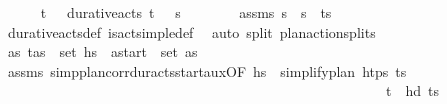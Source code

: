 \begin{isabellebody}
\ \ \ \ \isamarkupfalse%
\ {\isachardoublequoteopen}{\isacharparenleft}{\kern0pt}t\isactrlsub {\isasympi}{\isacharcomma}{\kern0pt}\ {\isasympi}{\isacharparenright}{\kern0pt}\ {\isasymin}\ durative{\isacharunderscore}{\kern0pt}acts\ {\isacharparenleft}{\kern0pt}{\isacharparenleft}{\kern0pt}t\isactrlsub {\isasympi}{\isacharcomma}{\kern0pt}\ {\isasympi}{\isacharparenright}{\kern0pt}\ {\isacharhash}{\kern0pt}\ {\isasympi}s\isanewline
\ \ \ \ \ \ \isamarkupfalse%
\ assms\ {\isacartoucheopen}{\isasympi}s\ {\isacharequal}{\kern0pt}\ {\isasympi}s\ {\isacharat}{\kern0pt}\ {\isacharparenleft}{\kern0pt}{\isacharparenleft}{\kern0pt}t\isactrlsub {\isasympi}{\isacharcomma}{\kern0pt}{\isasympi}{\isacharparenright}{\kern0pt}{\isacharhash}{\kern0pt}{\isasympi}s\isanewline
\ \ \ \ \ \ \isamarkupfalse%
\ durative{\isacharunderscore}{\kern0pt}acts{\isacharunderscore}{\kern0pt}def\ is{\isacharunderscore}{\kern0pt}act{\isacharunderscore}{\kern0pt}simple{\isacharunderscore}{\kern0pt}def\ \isamarkupfalse%
\ {\isacharparenleft}{\kern0pt}auto\ split{\isacharcolon}{\kern0pt}\ plan{\isacharunderscore}{\kern0pt}action{\isachardot}{\kern0pt}splits{\isacharparenright}{\kern0pt}\isanewline
\ \ \ \ \isamarkupfalse%
\ {\isachardoublequoteopen}{\isasymexists}as{\isachardot}{\kern0pt}\ {\isacharparenleft}{\kern0pt}t\isactrlsub {\isasympi}{\isacharcomma}{\kern0pt}as{\isacharparenright}{\kern0pt}\ {\isasymin}\ set\ hs{\isacharprime}{\kern0pt}\ {\isasymand}\ a\isactrlsub s\isactrlsub t\isactrlsub a\isactrlsub r\isactrlsub t\ {\isasymin}\ set\ as{\isachardoublequoteclose}\isanewline
\ \ \ \ \ \ \isamarkupfalse%
\ assms\ simp{\isacharunderscore}{\kern0pt}plan{\isacharunderscore}{\kern0pt}corr{\isacharunderscore}{\kern0pt}dur{\isacharunderscore}{\kern0pt}acts{\isacharunderscore}{\kern0pt}start{\isacharunderscore}{\kern0pt}aux{\isacharbrackleft}{\kern0pt}OF\ {\isacartoucheopen}hs{\isacharprime}{\kern0pt}\ {\isacharequal}{\kern0pt}\ simplify{\isacharunderscore}{\kern0pt}plan\ htps\ {\isacharparenleft}{\kern0pt}{\isacharparenleft}{\kern0pt}t\isactrlsub {\isasympi}{\isacharcomma}{\kern0pt}{\isasympi}{\isacharparenright}{\kern0pt}{\isacharhash}{\kern0pt}{\isasympi}s\ \isanewline
\ \ \ \ \ \ \ \ \ \ \ \ \ \ \ \ \ \ \ \ \ \ \ \ \ \ \ \ \ \ \ \ \ \ \ \ \ \ \ \ \ \ \ \ \ \ \ \ \ \ \ \ \ \ \ {\isacartoucheopen}{\isacharparenleft}{\kern0pt}t\isactrlsub {\isasympi}{\isacharcomma}{\kern0pt}{\isasympi}{\isacharparenright}{\kern0pt}\ {\isacharequal}{\kern0pt}\ hd\ {\isacharparenleft}{\kern0pt}{\isacharparenleft}{\kern0pt}t\isactrlsub {\isasympi}{\isacharcomma}{\kern0pt}{\isasympi}{\isacharparenright}{\kern0pt}{\isacharhash}{\kern0pt}{\isasympi}s\ \isanewline

\end{isabellebody}
